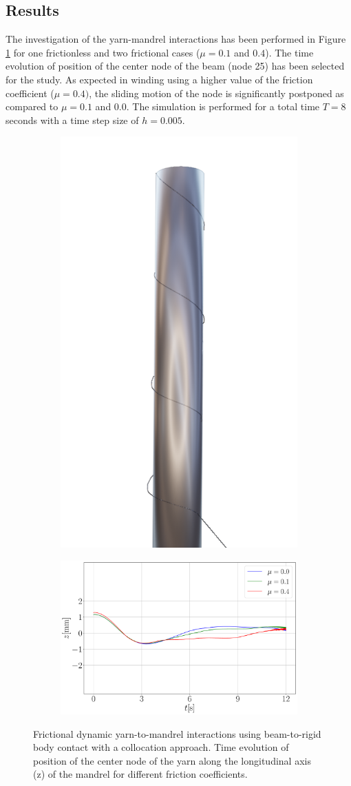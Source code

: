 \subsection{Results}
The investigation of the yarn-mandrel interactions has been performed in Figure \ref{fig:fricvalues} for one frictionless and two frictional cases ($\mu = 0.1$ and $0.4$). The time evolution of position of the center node of the beam (node 25) has been selected for the study. As expected in winding using a higher value of the friction coefficient ($\mu = 0.4)$, the sliding motion of the node is significantly postponed as compared to $\mu = 0.1$ and $0.0$. The simulation is performed for a total time $T = 8$ seconds with a time step size of $h = 0.005$.

\begin{figure}[h]
\centering
\begin{subfigure}
\centering
  \centering
  \includegraphics[width=0.27\linewidth]{figures/steel_mandrel_1.png}
  \end{subfigure}
\begin{subfigure}
  \centering
  \includegraphics[width=0.47\linewidth]{figures/mu_compare.pdf}
\end{subfigure}
\caption{Frictional dynamic yarn-to-mandrel interactions using beam-to-rigid body contact with a collocation approach. Time evolution of position of the center node of the yarn along the longitudinal axis (z) of the mandrel for different friction coefficients.}
\label{fig:fricvalues}
\end{figure}



















